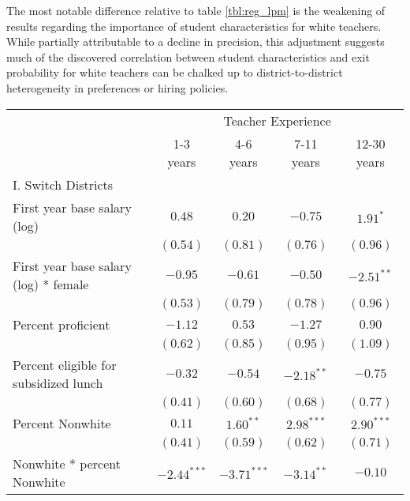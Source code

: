 \documentclass[12pt,]{article}
\begin{document}
The most notable difference relative to table \ref{tbl:reg_lpm} is the
weakening of results regarding the importance of student characteristics
for white teachers. While partially attributable to a decline in
precision, this adjustment suggests much of the discovered correlation
between student characteristics and exit probability for white teachers
can be chalked up to district-to-district heterogeneity in preferences
or hiring policies.

\begin{table}
\begin{center}
\begin{tabular}{l c c c c }
\hline
 & \multicolumn{4}{c}{Teacher Experience} \\ \cline{2-5}
 & 1-3 years & 4-6 years & 7-11 years & 12-30 years \\
\hline
I. Switch Districts                             &               &               &               &              \\
\quad First year base salary (log)           & $0.48$        & $0.20$        & $-0.75$       & $1.91^{*}$   \\
                                                & $(0.54)$      & $(0.81)$      & $(0.76)$      & $(0.96)$     \\
\quad First year base salary (log) * female  & $-0.95$       & $-0.61$       & $-0.50$       & $-2.51^{**}$ \\
                                                & $(0.53)$      & $(0.79)$      & $(0.78)$      & $(0.96)$     \\
\quad Percent proficient                     & $-1.12$       & $0.53$        & $-1.27$       & $0.90$       \\
                                                & $(0.62)$      & $(0.85)$      & $(0.95)$      & $(1.09)$     \\
\quad Percent eligible for subsidized lunch  & $-0.32$       & $-0.54$       & $-2.18^{**}$  & $-0.75$      \\
                                                & $(0.41)$      & $(0.60)$      & $(0.68)$      & $(0.77)$     \\
\quad Percent Nonwhite                       & $0.11$        & $1.60^{**}$   & $2.98^{***}$  & $2.90^{***}$ \\
                                                & $(0.41)$      & $(0.59)$      & $(0.62)$      & $(0.71)$     \\
\quad Nonwhite * percent Nonwhite            & $-2.44^{***}$ & $-3.71^{***}$ & $-3.14^{**}$  & $-0.10$      \\

\end{tabular}
\end{center}
\end{table}
\end{document}
